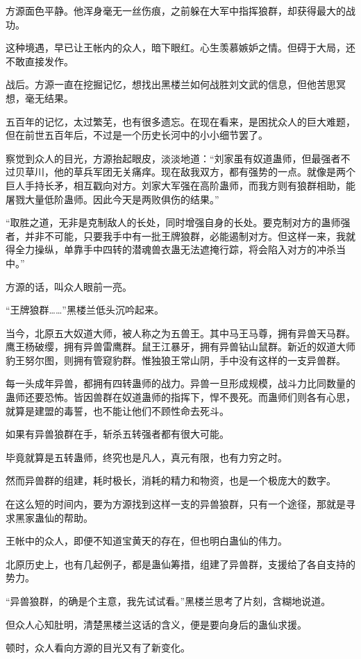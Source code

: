 \begin{this_body}
方源面色平静。他浑身毫无一丝伤痕，之前躲在大军中指挥狼群，却获得最大的战功。

这种境遇，早已让王帐内的众人，暗下眼红。心生羡慕嫉妒之情。但碍于大局，还不敢直接发作。

战后。方源一直在挖掘记忆，想找出黑楼兰如何战胜刘文武的信息，但他苦思冥想，毫无结果。

五百年的记忆，太过繁芜，也有很多遗忘。在现在看来，是困扰众人的巨大难题，但在前世五百年后，不过是一个历史长河中的小小细节罢了。

察觉到众人的目光，方源抬起眼皮，淡淡地道：“刘家虽有奴道蛊师，但最强者不过贝草川，他的草兵军团无关痛痒。现在敌我双方，都有强势的一点。就像是两个巨人手持长矛，相互戳向对方。刘家大军强在高阶蛊师，而我方则有狼群相助，能屠戮大量低阶蛊师。因此今天是两败俱伤的结果。”

“取胜之道，无非是克制敌人的长处，同时增强自身的长处。要克制对方的蛊师强者，并非不可能，只要我手中有一批王牌狼群，必能遏制对方。但这样一来，我就得全力操纵，单靠手中四转的潜魂兽衣蛊无法遮掩行踪，将会陷入对方的冲杀当中。”

方源的话，叫众人眼前一亮。

“王牌狼群……”黑楼兰低头沉吟起来。

当今，北原五大奴道大师，被人称之为五兽王。其中马王马尊，拥有异兽天马群。鹰王杨破缨，拥有异兽雷鹰群。鼠王江暴牙，拥有异兽钻山鼠群。新近的奴道大师豹王努尔图，则拥有管窥豹群。惟独狼王常山阴，手中没有这样的一支异兽群。

每一头成年异兽，都拥有四转蛊师的战力。异兽一旦形成规模，战斗力比同数量的蛊师还要恐怖。皆因兽群在奴道蛊师的指挥下，悍不畏死。而蛊师们则各有心思，就算是建盟的毒誓，也不能让他们不顾性命去死斗。

如果有异兽狼群在手，斩杀五转强者都有很大可能。

毕竟就算是五转蛊师，终究也是凡人，真元有限，也有力穷之时。

然而异兽群的组建，耗时极长，消耗的精力和物资，也是一个极庞大的数字。

在这么短的时间内，要为方源找到这样一支的异兽狼群，只有一个途径，那就是寻求黑家蛊仙的帮助。

王帐中的众人，即便不知道宝黄天的存在，但也明白蛊仙的伟力。

北原历史上，也有几起例子，都是蛊仙筹措，组建了异兽群，支援给了各自支持的势力。

“异兽狼群，的确是个主意，我先试试看。”黑楼兰思考了片刻，含糊地说道。

但众人心知肚明，清楚黑楼兰这话的含义，便是要向身后的蛊仙求援。

顿时，众人看向方源的目光又有了新变化。


\end{this_body}

